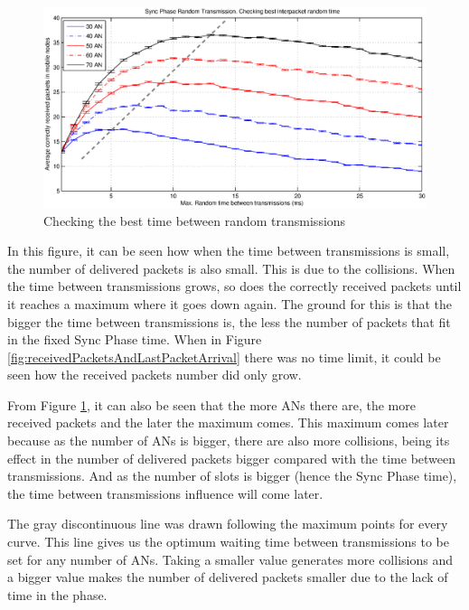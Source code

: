 \begin{figure}[ht]
 \begin{center}
  \includegraphics[width=1\textwidth]{randomTimeCheckingTheBestInterpacketRandomTime.eps}
 \end{center}
 \caption{Checking the best time between random transmissions}
 \label{fig:randomTimeCheckingTheBestInterpacketRandomTime}
\end{figure}

In this figure, it can be seen how when the time between transmissions is small, the number of delivered packets is also small. This is due to the 
collisions. When the time between transmissions grows, so does the correctly received packets until it reaches a maximum where it goes down again.
The ground for this is that the bigger the time between transmissions is, the less the number of packets that fit in the fixed Sync Phase time. When in 
Figure \ref{fig:receivedPacketsAndLastPacketArrival} there was no time limit, it could be seen how the received packets number did only grow.

From Figure \ref{fig:randomTimeCheckingTheBestInterpacketRandomTime}, it can also be seen that the more \acp{AN} there are, the more received packets and
the later the maximum comes. This maximum comes later because as the number of \acp{AN} is bigger, there are also more collisions, being its effect in the 
number of delivered packets bigger compared with the time between transmissions. And as the number of slots is bigger (hence the Sync Phase time), the 
time between transmissions influence will come later.

The gray discontinuous line was drawn following the maximum points for every curve. This line gives us the optimum waiting time between transmissions to 
be set for any number of \acp{AN}. Taking a smaller value generates more collisions and a bigger value makes the number of delivered packets smaller due
to the lack of time in the phase.

